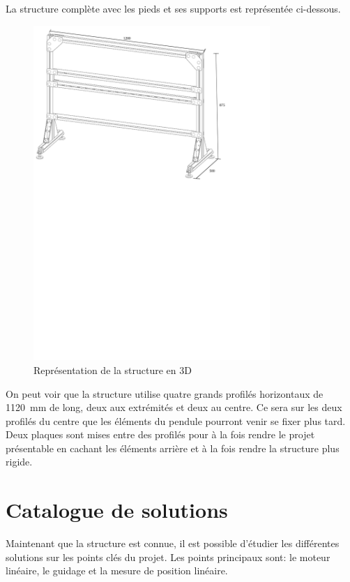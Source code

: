 La structure complète avec les pieds et ses supports est représentée ci-dessous.
\begin{figure}[H]
  \centering
  \includegraphics[width = 0.8\textwidth]{assets/figures/Structure.svg}
  \caption{Représentation de la structure en 3D}
  \label{fig:DescStruct}
\end{figure}

On peut voir que la structure utilise quatre grands profilés horizontaux de 1120~mm de long, deux aux extrémités et deux au centre. Ce sera sur les deux profilés du centre que
les éléments du pendule pourront venir se fixer plus tard. Deux plaques sont mises entre des profilés pour à la fois rendre le projet présentable
en cachant les éléments arrière et à la fois rendre la structure plus rigide.

\section{Catalogue de solutions}\label{sec:CatSol}
Maintenant que la structure est connue, il est possible d'étudier les différentes solutions sur les points clés du projet.
Les points principaux sont: le moteur linéaire, le guidage et la mesure de position linéaire.\\

